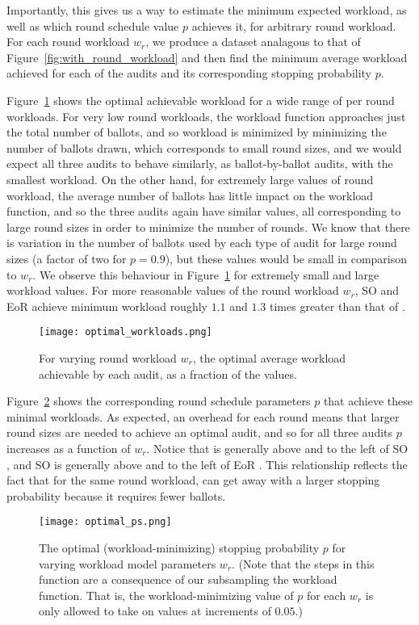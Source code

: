 Importantly, this gives us a way to estimate the minimum expected workload, as well as which round schedule value $p$ achieves it, for arbitrary round workload. For each round workload $w_r$, we produce a dataset analagous to that of Figure~\ref{fig:with_round_workload} and then find the minimum average workload achieved for each of the audits and its corresponding stopping probability $p$. 

Figure~\ref{fig:optimal_workloads} shows the optimal achievable workload for a wide range of per round workloads. For very low round workloads, the workload function approaches just the total number of ballots, and so workload is minimized by minimizing the number of ballots drawn, which corresponds to small round sizes, and we would expect all three audits to behave similarly, as ballot-by-ballot audits, with the smallest workload. On the other hand, for extremely large values of round workload, the average number of ballots has little impact on the workload function, and so the three audits again have similar values, all corresponding to large round sizes in order to minimize the number of rounds.  We know that there is variation in the number of ballots used by each type of audit for large round sizes (a factor of two for $p=0.9$), but these values would be small in comparison to $w_r$. We observe this behaviour in Figure~\ref{fig:optimal_workloads} for extremely small and large workload values. For more reasonable values of the round workload $w_r$, SO \BRAVO and EoR \BRAVO achieve minimum workload roughly $1.1$ and $1.3$ times greater than that of \Providence.
\begin{figure}[h!]
\texttt{[image: optimal\_workloads.png]}
\caption{For varying round workload $w_r$, the optimal average workload achievable by each audit, as a fraction of the \Providence values.}
\label{fig:optimal_workloads}
\end{figure}

Figure~\ref{fig:optimal_ps} shows the corresponding round schedule parameters $p$ that achieve these minimal workloads. As expected, an overhead for each round means that larger round sizes are needed to achieve an optimal audit, and so for all three audits $p$ increases as a function of $w_r$. Notice that \Providence is generally above and to the left of SO \BRAVO, and SO \BRAVO is generally above and to the left of EoR \BRAVO. This relationship reflects the fact that for the same round workload, \Providence can get away with a larger stopping probability because it requires fewer ballots.
\begin{figure}[h!]
\texttt{[image: optimal\_ps.png]}
\caption{The optimal (workload-minimizing) stopping probability $p$ for varying workload model parameters $w_r$. (Note that the steps in this function are a consequence of our subsampling the workload function. That is, the workload-minimizing value of $p$ for each $w_r$ is only allowed to take on values at increments of $0.05$.)}
\label{fig:optimal_ps}
\end{figure}

